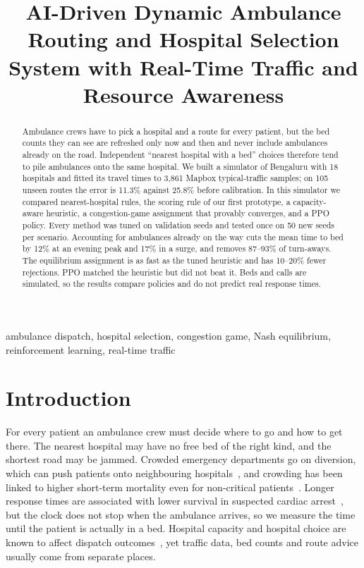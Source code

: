 \documentclass[conference]{IEEEtran}
\begin{document}
\title{AI-Driven Dynamic Ambulance Routing and Hospital Selection System with Real-Time Traffic and Resource Awareness}

\author{\IEEEauthorblockN{\hspace{0pt}}}

\maketitle

\begin{abstract}
Ambulance crews have to pick a hospital and a route for every patient, but the bed counts they can see are refreshed only now and then and never include ambulances already on the road. Independent ``nearest hospital with a bed'' choices therefore tend to pile ambulances onto the same hospital. We built a simulator of Bengaluru with 18 hospitals and fitted its travel times to 3,861 Mapbox typical-traffic samples; on 105 unseen routes the error is 11.3\% against 25.8\% before calibration. In this simulator we compared nearest-hospital rules, the scoring rule of our first prototype, a capacity-aware heuristic, a congestion-game assignment that provably converges, and a PPO policy. Every method was tuned on validation seeds and tested once on 50 new seeds per scenario. Accounting for ambulances already on the way cuts the mean time to bed by 12\% at an evening peak and 17\% in a surge, and removes 87--93\% of turn-aways. The equilibrium assignment is as fast as the tuned heuristic and has 10--20\% fewer rejections. PPO matched the heuristic but did not beat it. Beds and calls are simulated, so the results compare policies and do not predict real response times.
\end{abstract}

\begin{IEEEkeywords}
ambulance dispatch, hospital selection, congestion game, Nash equilibrium, reinforcement learning, real-time traffic
\end{IEEEkeywords}

\section{Introduction}
For every patient an ambulance crew must decide where to go and how to get there. The nearest hospital may have no free bed of the right kind, and the shortest road may be jammed. Crowded emergency departments go on diversion, which can push patients onto neighbouring hospitals~\cite{baan2025emergency}, and crowding has been linked to higher short-term mortality even for non-critical patients~\cite{eidsto2024emergency}. Longer response times are associated with lower survival in suspected cardiac arrest~\cite{janosikova2026logistic}, but the clock does not stop when the ambulance arrives, so we measure the time until the patient is actually in a bed. Hospital capacity and hospital choice are known to affect dispatch outcomes~\cite{xu2024emergency,fu2025modelling}, yet traffic data, bed counts and route advice usually come from separate places.
\end{document}
